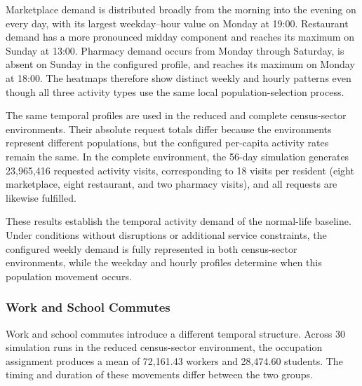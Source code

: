 Marketplace demand is distributed broadly from the morning into the evening on every day, with its largest weekday--hour value on Monday at 19:00. Restaurant demand has a more pronounced midday component and reaches its maximum on Sunday at 13:00. Pharmacy demand occurs from Monday through Saturday, is absent on Sunday in the configured profile, and reaches its maximum on Monday at 18:00. The heatmaps therefore show distinct weekly and hourly patterns even though all three activity types use the same local population-selection process.

The same temporal profiles are used in the reduced and complete census-sector environments. Their absolute request totals differ because the environments represent different populations, but the configured per-capita activity rates remain the same. %
In the complete environment, the 56-day simulation generates 23,965,416 requested activity visits, corresponding to 18 visits per resident (eight marketplace, eight restaurant, and two pharmacy visits), and all requests are likewise fulfilled.%

These results establish the temporal activity demand of the normal-life baseline. Under conditions without disruptions or additional service constraints, the configured weekly demand is fully represented in both census-sector environments, while the weekday and hourly profiles determine when this population movement occurs.

\subsubsection{Work and School Commutes}
\label{sec:routine_mobility_commute_temporal}

Work and school commutes introduce a different temporal structure. Across 30 simulation runs in the reduced census-sector environment, the occupation assignment produces a mean of 72,161.43 workers and 28,474.60 students. %
The timing and duration of these movements differ between the two groups.


